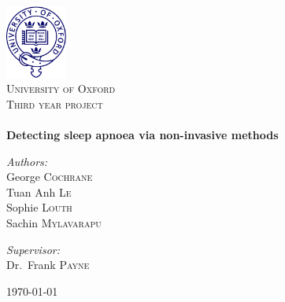 \begin{titlepage}
\begin{center}

\includegraphics[width=0.15\textwidth]{drawings/oxford.pdf}~\\[1cm]

\textsc{\LARGE University of Oxford}\\[1.5cm]

\textsc{\Large Third year project}\\[0.5cm]

\HRule \\[0.4cm]
{\huge \bfseries Detecting sleep apnoea via non-invasive methods}
\HRule \\[1.5cm]

\begin{minipage}{0.4\textwidth}
\begin{flushleft} \large
\emph{Authors:}\\
George \textsc{Cochrane}\\
Tuan Anh \textsc{Le}\\
Sophie \textsc{Louth}\\
Sachin \textsc{Mylavarapu}
\end{flushleft}
\end{minipage}
\begin{minipage}{0.4\textwidth}
\begin{flushright} \large
\emph{Supervisor:} \\
Dr.~Frank \textsc{Payne}
\end{flushright}
\end{minipage}

\vfill

{\large \today}

\end{center}
\end{titlepage}